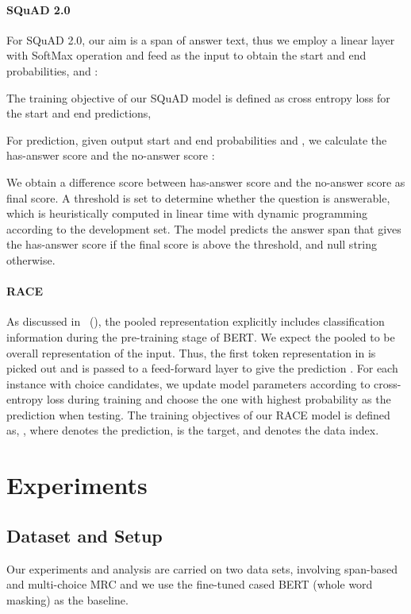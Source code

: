 \documentclass[letterpaper]{article} \usepackage{color}
\begin{document}
\paragraph{SQuAD 2.0}
For SQuAD 2.0, our aim is a span of answer text, thus we employ a linear layer with SoftMax operation and feed  as the input to obtain the start and end probabilities,  and :





The training objective of our SQuAD model is defined as cross entropy loss for the start and end predictions, 

For prediction, given output start and end probabilities  and , we calculate the has-answer score  and the no-answer score :


We obtain a difference score between has-answer score and the no-answer score as final score. A threshold  is set to determine whether the question is answerable, which is heuristically computed in linear time with dynamic programming according to the development set. The model predicts the answer span that gives the has-answer score if the final score is above the threshold, and null string otherwise.

\paragraph{RACE}
As discussed in \citeauthor{devlin2018bert}~(\citeyear{devlin2018bert}), the pooled representation explicitly includes classification information during the pre-training stage of BERT. We expect the pooled to be overall representation of the input. Thus, the first token representation  in  is picked out and is passed to a feed-forward layer to give the prediction . For each instance with  choice candidates, we update model parameters according to cross-entropy loss during training and choose the one with highest probability as the prediction when testing. 
The training objectives of our RACE model is defined as, , where  denotes the prediction,  is the target, and  denotes the data index.


\section{Experiments}
\subsection{Dataset and Setup}
Our experiments and analysis are carried on two data sets, involving span-based and multi-choice MRC and we use the fine-tuned cased BERT (whole word masking) as the baseline. 
\end{document}
